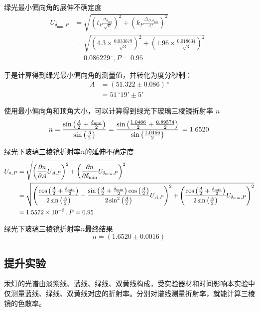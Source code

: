 \documentclass[10pt,a4paper]{article}	%
\begin{document}
	绿光最小偏向角的展伸不确定度
	$$
	\begin{aligned}
	U_{{\delta_{\min}},P}&=\sqrt{\left(t_P\frac{\sigma_{{\delta_{\min}}}}{\sqrt{n}}\right)^2+\left(k_P\frac{\Delta_{B,{\delta_{\min}}}}{C}\right)^2}\\
	&=\sqrt{\left(4.3\times\frac{0.033679}{\sqrt{3}}\right)^2+\left(1.96\times\frac{0.018634}{\sqrt{3}}\right)^2}\,\mathrm{^{\circ}}\\
	&=0.086229\,\mathrm{^{\circ}},P=0.95
	\end{aligned}
	$$

	于是计算得到绿光最小偏向角的测量值，并转化为度分秒制：
	$$
	\begin{aligned}
	A &= (51.322 \pm 0.086)\,\mathrm{^\circ} \\
	  &= 51\,\mathrm{^\circ}19' \pm 5'
	\end{aligned}
	$$

	使用最小偏向角和顶角大小，可以计算得到绿光下玻璃三棱镜折射率 $n$
	$$
	n=\frac{\sin{\left(\frac{A}{2} + \frac{\delta_{\rm min}}{2} \right)}}{\sin{\left(\frac{A}{2} \right)}}=\frac{\sin{\left(\frac{1.0466}{2}+\frac{0.89574}{2}\right)}}{\sin{\left(\frac{1.0466}{2}\right)}}\,\mathrm{}=1.6520\,\mathrm{}
	$$

	绿光下玻璃三棱镜折射率$n$的延伸不确定度
	$$
	\begin{aligned}
	U_{n,P}&=\sqrt{\left(\frac{\partial n}{\partial A}U_{A,P}\right)^2+\left(\frac{\partial n}{\partial \delta_{\rm min}}U_{\delta_{\rm min},P}\right)^2}\\
	&=\sqrt{\left(\frac{\cos{\left(\frac{A}{2} + \frac{\delta_{\rm min}}{2} \right)}}{2 \sin{\left(\frac{A}{2} \right)}} - \frac{\sin{\left(\frac{A}{2} + \frac{\delta_{\rm min}}{2} \right)} \cos{\left(\frac{A}{2} \right)}}{2 \sin^{2}{\left(\frac{A}{2} \right)}}U_{A,P}\right)^2+\left(\frac{\cos{\left(\frac{A}{2} + \frac{\delta_{\rm min}}{2} \right)}}{2 \sin{\left(\frac{A}{2} \right)}}U_{\delta_{\rm min},P}\right)^2}\\
	&=1.5572 \times 10^{-3}\,\mathrm{},P=0.95
	\end{aligned}
	$$

	绿光下玻璃三棱镜折射率$n$最终结果
	$$
	n=\left(1.6520 \pm 0.0016\right)\,\mathrm{}
	$$
	
	
	

	\subsection{提升实验}
	
	汞灯的光谱由淡紫线、蓝线、绿线、双黄线构成，受实验器材和时间影响本实验中仅测量蓝线、绿线、双黄线对应的折射率。分别对谱线测量折射率，就能计算三棱镜的色散率。
	
\end{document}
